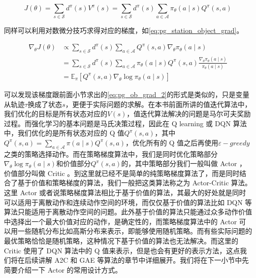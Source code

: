 \begin{equation}
    \label{eq:pg_station_object}
    J(\theta)=\sum_{s \in \mathcal{S}} d^\pi(s) V^\pi(s)=\sum_{s \in \mathcal{S}} d^\pi(s) \sum_{a \in \mathcal{A}} \pi_\theta(a \mid s) Q^\pi(s, a)
\end{equation}

同样可以利用对数微分技巧求得对应的梯度，如\eqref{eq:pg_station_object_grad}。

\begin{equation}
    \label{eq:pg_station_object_grad}
    \begin{aligned}
    \nabla_\theta J(\theta) & \propto \sum_{s \in \mathcal{S}} d^\pi(s) \sum_{a \in \mathcal{A}} Q^\pi(s, a) \nabla_\theta \pi_\theta(a \mid s) \\
    &=\sum_{s \in \mathcal{S}} d^\pi(s) \sum_{a \in \mathcal{A}} \pi_\theta(a \mid s) Q^\pi(s, a) \frac{\nabla_\theta \pi_\theta(a \mid s)}{\pi_\theta(a \mid s)} \\
    &=\mathbb{E}_\pi\left[Q^\pi(s, a) \nabla_\theta \log \pi_\theta(a \mid s)\right]
    \end{aligned}
\end{equation}

可以发现该梯度跟前面小节求出的\eqref{eq:pg_ob_grad_2}的形式是类似的，只是变量从轨迹$\tau$换成了状态$s$，更便于实际问题的求解。在本书前面所讲的值迭代算法中，我们优化的目标是所有状态对应的$V(s)$，值迭代算法解决的问题是马尔可夫奖励过程。而强化学习的基本问题是马氏决策过程，因此在 Q learning 或 DQN 算法中，我们优化的是所有状态对应的 Q 值$Q^\pi(s, a)$，其中$Q^\pi(s, a)=\sum_{a \in \mathcal{A}} \pi(a \mid s) Q^\pi(s, a)$，优化所有的 Q 值之后再使用$\varepsilon - greedy$之类的策略选择动作。而在策略梯度算法中，我们是同时优化策略部分$\nabla_\theta \log \pi_\theta(a \mid s)$和价值部分$Q^\pi(s, a)$的，其中策略部分我们一般叫做 Actor ，价值部分叫做 Critic 。到这里就已经不是简单的纯策略梯度算法了，而是同时结合了基于价值和策略梯度的算法，我们一般把这类算法称之为 Actor-Critic 算法。这里 Actor 或者说策略梯度算法相比于基于价值的算法，其最大的好处就是同时可以适用于离散动作和连续动作空间的环境，而仅仅基于价值的算法比如 DQN 等算法只能适用于离散动作空间的问题。此外基于价值的算法只能通过众多动作价值中选择出一个最大价值对应的动作，是确定性的，而策略梯度算法中的 Actor 可以用一些随机分布比如高斯分布来表示，即能够使用随机策略。而有些实际问题的最优策略恰恰是随机策略，这种情况下基于价值的算法也无法解决。而这里的 Critic 使用了 DQN 算法中的 Q 值来表示，但是也会有更好的表示方法，这点我们将在后续讲解 A2C 和 GAE 等算法的章节中详细展开。我们将在下一小节中先简要介绍一下 Actor 的常用设计方式。

